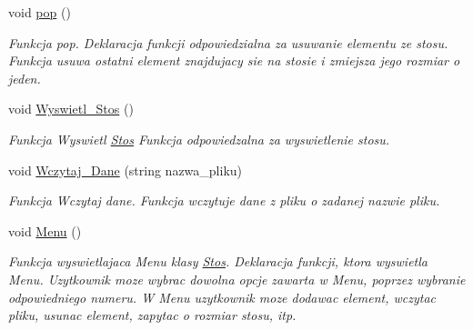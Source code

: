 \begin{DoxyCompactItemize}
void \hyperlink{class_stos_a88b0da41b49ef4d4b63cfd4924665683}{pop} ()
\begin{DoxyCompactList}\small\item\em \-Funkcja pop. \-Deklaracja funkcji odpowiedzialna za usuwanie elementu ze stosu. \-Funkcja usuwa ostatni element znajdujacy sie na stosie i zmiejsza jego rozmiar o jeden. \end{DoxyCompactList}\item 
void \hyperlink{class_stos_acfa731646fc656e7f9484aab1b00ef52}{\-Wyswietl\-\_\-\-Stos} ()
\begin{DoxyCompactList}\small\item\em \-Funkcja \-Wyswietl \hyperlink{class_stos}{\-Stos} \-Funkcja odpowiedzalna za wyswietlenie stosu. \end{DoxyCompactList}\item 
void \hyperlink{class_stos_ae9bc0edc8991d6951738e8c332fdbffd}{\-Wczytaj\-\_\-\-Dane} (string nazwa\-\_\-pliku)
\begin{DoxyCompactList}\small\item\em \-Funkcja \-Wczytaj dane. \-Funkcja wczytuje dane z pliku o zadanej nazwie pliku. \end{DoxyCompactList}\item 
void \hyperlink{class_stos_a9d3f8602bd8a9463cb59f7385b438b69}{\-Menu} ()
\begin{DoxyCompactList}\small\item\em \-Funkcja wyswietlajaca \-Menu klasy \hyperlink{class_stos}{\-Stos}. \-Deklaracja funkcji, ktora wyswietla \-Menu. \-Uzytkownik moze wybrac dowolna opcje zawarta w \-Menu, poprzez wybranie odpowiedniego numeru. \-W \-Menu uzytkownik moze dodawac element, wczytac pliku, usunac element, zapytac o rozmiar stosu, itp. \end{DoxyCompactList}\end{DoxyCompactItemize}
